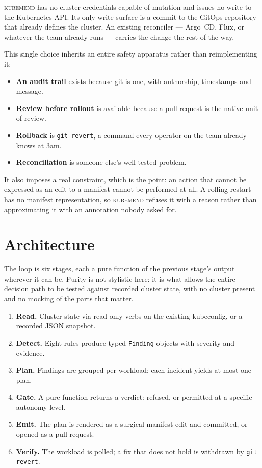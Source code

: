 \documentclass[11pt,a4paper]{article}
\newcommand{\code}[1]{\texttt{\small #1}}
\newcommand{\kubemend}{\textsc{kubemend}}
\begin{document}
\kubemend{} has no cluster credentials capable of mutation and issues no write to
the Kubernetes API. Its only write surface is a commit to the GitOps repository
that already defines the cluster. An existing reconciler --- Argo~CD, Flux, or
whatever the team already runs --- carries the change the rest of the way.

This single choice inherits an entire safety apparatus rather than
reimplementing it:

\begin{itemize}
  \item \textbf{An audit trail} exists because git is one, with authorship, timestamps and message.
  \item \textbf{Review before rollout} is available because a pull request is the native unit of review.
  \item \textbf{Rollback} is \code{git revert}, a command every operator on the team already knows at 3am.
  \item \textbf{Reconciliation} is someone else's well-tested problem.
\end{itemize}

It also imposes a real constraint, which is the point: an action that cannot be
expressed as an edit to a manifest cannot be performed at all. A rolling restart
has no manifest representation, so \kubemend{} refuses it with a reason rather
than approximating it with an annotation nobody asked for.

\section{Architecture}

The loop is six stages, each a pure function of the previous stage's output
wherever it can be. Purity is not stylistic here: it is what allows the entire
decision path to be tested against recorded cluster state, with no cluster
present and no mocking of the parts that matter.


\begin{enumerate}
  \item \textbf{Read.} Cluster state via read-only verbs on the existing kubeconfig, or a recorded JSON snapshot.
  \item \textbf{Detect.} Eight rules produce typed \code{Finding} objects with severity and evidence.
  \item \textbf{Plan.} Findings are grouped per workload; each incident yields at most one plan.
  \item \textbf{Gate.} A pure function returns a verdict: refused, or permitted at a specific autonomy level.
  \item \textbf{Emit.} The plan is rendered as a surgical manifest edit and committed, or opened as a pull request.
  \item \textbf{Verify.} The workload is polled; a fix that does not hold is withdrawn by \code{git revert}.
\end{enumerate}
\end{document}
